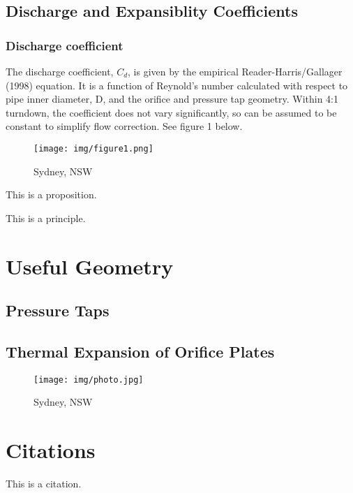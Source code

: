 \documentclass{article}
\begin{document}
\subsection{Discharge and Expansiblity Coefficients}
\subsubsection{Discharge coefficient}
The discharge coefficient, $C_d$, is given by the empirical Reader-Harris/Gallager (1998) equation. It is a function of Reynold's number calculated with respect to pipe inner diameter, D, and the orifice and pressure tap geometry. Within 4:1 turndown, the coefficient does not vary significantly, so can be assumed to be constant to simplify flow correction.
See figure 1 below.

\begin{figure}[htbp]
    \center
    \texttt{[image: img/figure1.png]}
    \caption{Sydney, NSW}
\end{figure}

\begin{proposition}
    This is a proposition.
\end{proposition}

\begin{principle}
    This is a principle.
\end{principle}


\section{Useful Geometry}
\subsection{Pressure Taps}
\subsection{Thermal Expansion of Orifice Plates}
\begin{figure}[htbp]
    \center
    \texttt{[image: img/photo.jpg]}
    \caption{Sydney, NSW}
\end{figure}

\section{Citations}

This is a citation\cite{Eg}.

\newpage





\end{document}
